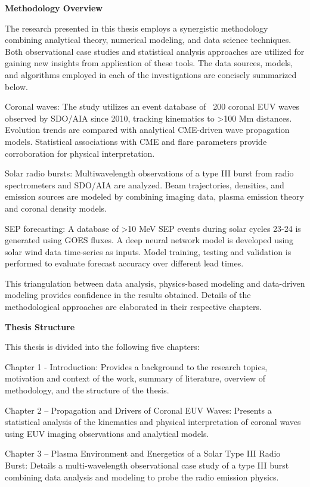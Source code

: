 \documentclass{article}
\begin{document}
\textbf{Methodology Overview}

The research presented in this thesis employs a synergistic methodology combining analytical theory, numerical modeling, and data science techniques. Both observational case studies and statistical analysis approaches are utilized for gaining new insights from application of these tools. The data sources, models, and algorithms employed in each of the investigations are concisely summarized below.

Coronal waves: The study utilizes an event database of ~200 coronal EUV waves observed by SDO/AIA since 2010, tracking kinematics to >100 Mm distances. Evolution trends are compared with analytical CME-driven wave propagation models. Statistical associations with CME and flare parameters provide corroboration for physical interpretation.

Solar radio bursts: Multiwavelength observations of a type III burst from radio spectrometers and SDO/AIA are analyzed. Beam trajectories, densities, and emission sources are modeled by combining imaging data, plasma emission theory and coronal density models. 

SEP forecasting: A database of >10 MeV SEP events during solar cycles 23-24 is generated using GOES fluxes. A deep neural network model is developed using solar wind data time-series as inputs. Model training, testing and validation is performed to evaluate forecast accuracy over different lead times.

This triangulation between data analysis, physics-based modeling and data-driven modeling provides confidence in the results obtained. Details of the methodological approaches are elaborated in their respective chapters.


\textbf{Thesis Structure}

This thesis is divided into the following five chapters:

Chapter 1 - Introduction: Provides a background to the research topics, motivation and context of the work, summary of literature, overview of methodology, and the structure of the thesis. 

Chapter 2 – Propagation and Drivers of Coronal EUV Waves: Presents a statistical analysis of the kinematics and physical interpretation of coronal waves using EUV imaging observations and analytical models.

Chapter 3 – Plasma Environment and Energetics of a Solar Type III Radio Burst: Details a multi-wavelength observational case study of a type III burst combining data analysis and modeling to probe the radio emission physics. 
\end{document}
